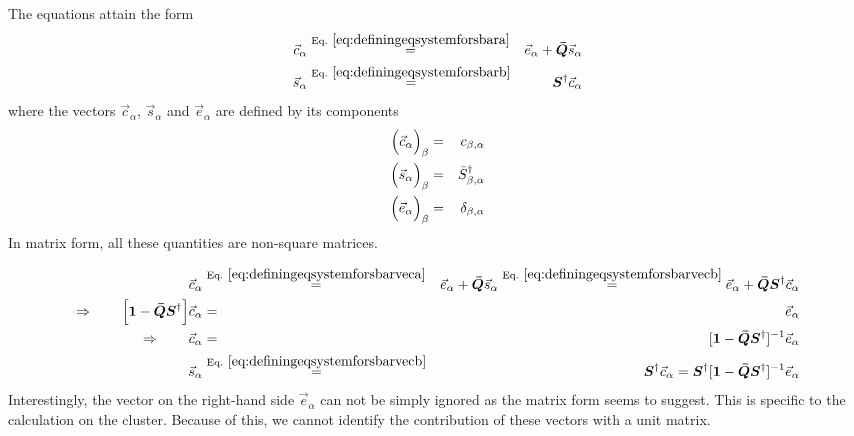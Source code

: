 \documentclass[11pt,a4paper]{report}
\begin{document}
The equations attain the form
\begin{eqnarray}
\vec{c}_\alpha&\eqrel{eq:definingeqsystemforsbara}{=}&
\vec{e}_\alpha+\mat{\bar{Q}}\vec{s}_\alpha
\label{eq:definingeqsystemforsbarveca}
\\
\vec{s}_\alpha&\eqrel{eq:definingeqsystemforsbarb}{=}&
\mat{S}^\dagger\vec{c}_\alpha
\label{eq:definingeqsystemforsbarvecb}
\label{eq:definingeqsystemforsbarvec}
\end{eqnarray}
where the vectors $\vec{c}_\alpha$, $\vec{s}_\alpha$ and $\vec{e}_\alpha$ are
defined by its components
\begin{eqnarray}
\Bigl(\vec{c}_\alpha\Bigr)_\beta&=&c_{\beta,\alpha}
\nonumber\\
\Bigl(\vec{s}_\alpha\Bigr)_\beta&=&\bar{S}^\dagger_{\beta,\alpha}
\nonumber\\
\Bigl(\vec{e}_\alpha\Bigr)_\beta&=&\delta_{\beta,\alpha}
\end{eqnarray}
In matrix form, all these quantities are non-square matrices.

\begin{eqnarray}
\vec{c}_\alpha
&\eqrel{eq:definingeqsystemforsbarveca}{=}&
\vec{e}_\alpha+\mat{\bar{Q}}\vec{s}_\alpha
\eqrel{eq:definingeqsystemforsbarvecb}{=}
\vec{e}_\alpha+\mat{\bar{Q}}\mat{S}^\dagger\vec{c}_\alpha
\nonumber\\
\Rightarrow\qquad
\Bigl[\mat{1}-\mat{\bar{Q}}\mat{S}^\dagger\Bigr]\vec{c}_\alpha&=&\vec{e}_\alpha
\nonumber\\
\Rightarrow\qquad
\vec{c}_\alpha&=&[\mat{1}-\mat{\bar{Q}}\mat{S}^\dagger]^{-1}\vec{e}_\alpha
\nonumber\\
\vec{s}_\alpha
&\eqrel{eq:definingeqsystemforsbarvecb}{=}&
\mat{S}^\dagger\vec{c}_\alpha
=\mat{S}^\dagger[\mat{1}-\mat{\bar{Q}}\mat{S}^\dagger]^{-1}\vec{e}_\alpha
\end{eqnarray}
Interestingly, the vector on the right-hand side $\vec{e}_\alpha$ can
not be simply ignored as the matrix form seems to suggest. This is
specific to the calculation on the cluster. Because of this, we cannot
identify the contribution of these vectors with a unit matrix.
\end{document}

